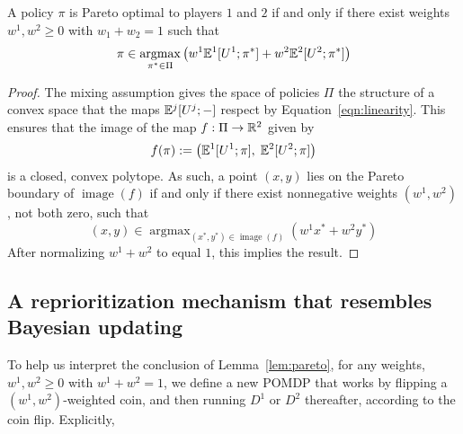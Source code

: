 \documentclass{article}
\newcommand{\eqn}[1]{Equation~\ref{eqn:#1}}
\newcommand{\lem}[1]{Lemma~\ref{lem:#1}}
\DeclareMathOperator*{\argmax}{argmax}
\DeclareMathOperator{\image}{image}
\begin{document}
\begin{lemma}\label{lem:pareto}
A policy $\pi$ is Pareto optimal to players $1$ and $2$ if and only if there exist weights $w^1,w^2\geq 0$ with $w_1+w_2=1$ such that
\begin{equation}\label{eqn:pareto}
\pi \in \argmax_{\pi^* \in\Pi}\left(w^1\EE^1[U^1;\pi^*] + w^2\EE^2[U^2; \pi^*]\right)
\end{equation}
\end{lemma}

\begin{proof}
The mixing assumption gives the space of policies $\Pi$ the structure of a convex space that the maps $\mathbb{E}^j[U^j; -] $ respect by \eqn{linearity}.  This ensures that the image of the map $f:\Pi\to\mathbb{R}^2$ given by
\[
f(\pi) := \left(\mathbb{E}^1[U^1;\pi],\; \mathbb{E}^2[U^2;\pi]\right)
\]
is a closed, convex polytope.  As such, a point $(x,y)$ lies on the Pareto boundary of $\image(f)$ if and only if there exist nonnegative weights $(w^1,w^2)$, not both zero, such that 
\[
(x,y) \in \argmax_{(x^*,y^*)\in \image(f)} \left(w^1x^* + w^2y^*\right)
\]
After normalizing $w^1+w^2$ to equal $1$, this implies the result.
\end{proof}

\subsection{A reprioritization mechanism that resembles Bayesian updating}

To help us interpret the conclusion of \lem{pareto}, for any weights, $w^1,w^2\ge 0$ with $w^1+w^2=1$, we define a new POMDP that works by flipping a $(w^1,w^2)$-weighted coin, and then running $D^1$ or $D^2$ thereafter, according to the coin flip.  Explicitly, 
\end{document}
